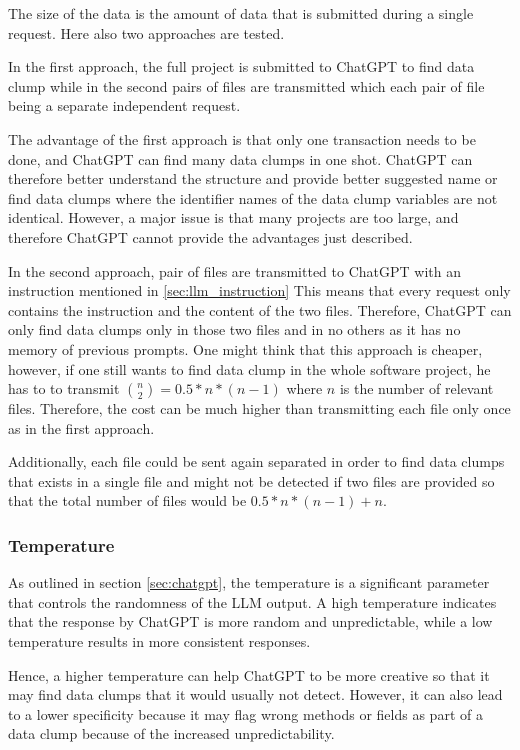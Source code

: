 The size of the data is the amount of data that is submitted during a single request. Here also two approaches are tested.

In the first approach, the full project is submitted to ChatGPT to find data clump while in the second pairs of files are transmitted which each pair of file being a separate independent request.

The advantage of the first approach is that only one transaction needs to be done, and ChatGPT can find many data clumps in one shot. ChatGPT can therefore better understand the structure and provide better suggested name or find data clumps where the identifier names of the data clump variables are not identical. However,  a major issue is that many projects are too large, and therefore ChatGPT cannot provide the advantages just described.

In the second approach, pair of files are transmitted to ChatGPT with an instruction mentioned in \ref{sec:llm_instruction}
This means that every request only contains the instruction and the content of the two files. Therefore, ChatGPT can only find data clumps only in those two files and in no others as it has no memory of previous prompts. One might think that this approach is cheaper, however, if one still wants to find data clump in the whole software project, he has to to transmit $\binom{n}{2}=0.5*n*(n-1)$ where $n$ is the number of relevant files. Therefore, the cost can be much higher than transmitting each file only once as in the first approach.

Additionally, each file could be sent again separated in order to find data clumps that exists in a single file and might not be detected if two files are provided so that the total number of files would be $0.5*n*(n-1)+n$.

\subsubsection{Temperature}
As outlined in section \ref{sec:chatgpt}, the temperature is a significant parameter that controls the randomness of the \ac{LLM} output. A high temperature indicates that the response by ChatGPT is more random and unpredictable, while a low temperature results in more consistent responses.

Hence, a higher temperature can help ChatGPT to be more creative so that it may find data clumps that it would usually not detect. However, it can also lead to a lower specificity because it may flag wrong methods or fields as part of a data clump because of the increased unpredictability. 

